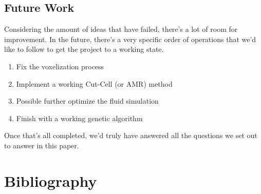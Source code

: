 \documentclass[a4paper,12pt,titlepage]{article}
\begin{document}
\subsection{Future Work}
Considering the amount of ideas that have failed, there's a lot of room for
improvement. In the future, there's a very specific order of operations that
we'd like to follow to get the project to a working state.
\begin{enumerate}
	\item{Fix the voxelization process}
	\item{Implement a working Cut-Cell (or AMR) method}
	\item{Possible further optimize the fluid simulation}
	\item{Finish with a working genetic algorithm}
\end{enumerate}
Once that's all completed, we'd truly have answered all the questions we set out
to answer in this paper.

\pagebreak
\section{Bibliography}
\nocite{*}
\printbibliography
\end{document}
